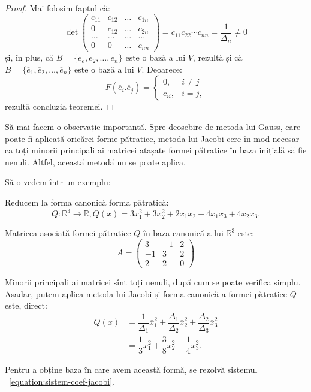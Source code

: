 \begin{proof}
Mai folosim faptul că: 
 \[
	\det \begin{pmatrix}
	          c_{11} & c_{12} & \dots & c_{1n} \\
	          0 & c_{12} & \dots & c_{2n} \\
	          \dots & \dots & \dots & \dots \\
	          0 & 0 & \dots & c_{nn}
         \end{pmatrix} = c_{11} c_{22} \cdots c_{nn} = \dfrac{1}{\Delta_n} 
    \neq 0
\]
și, în plus, că $B = \{e_e, e_2, \dots, e_n\}$ este o bază a lui $V$, rezultă și
că $\overline{B} = \{\overline{e}_1, \overline{e}_2, \dots, \overline{e}_n \}$
este o bază a lui $V$. Deoarece: 
 \[
	F(\overline{e}_i. \overline{e}_j) = \begin{cases}	
	                                        0, & i \neq j \\
	                                        c_{ii}, & i = j,
                                         \end{cases}
\]
rezultă concluzia teoremei.
\end{proof}

Să mai facem o observație importantă. Spre deosebire de metoda lui Gauss, care
poate fi aplicată oricărei forme pătratice, metoda lui Jacobi cere în mod 
necesar ca toți minorii principali ai matricei atașate formei pătratice în baza
inițială să fie nenuli. Altfel, această metodă nu se poate aplica.

Să o vedem într-un exemplu:
\begin{example}
	Reducem la forma canonică forma pătratică: 
 \[
	Q : \mathbb{R}^3 \to \mathbb{R}, 
	Q(x) = 3x_1^2 + 3x_2^2 + 2x_1 x_2 + 4x_1x_3 + 4x_2x_3.
\]

Matricea asociată formei pătratice $Q$ în baza canonică a lui $\mathbb{R}^3$
este: 
 \[
	A = \begin{pmatrix}
	        3 & -1 & 2 \\
	        -1 & 3 & 2 \\
	        2 & 2 & 0
        \end{pmatrix}
\]

Minorii principali ai matricei sînt toți nenuli, după cum se poate verifica
simplu. Așadar, putem aplica metoda lui Jacobi și forma canonică a formei 
pătratice $Q$ este, direct:
\begin{align*}
	Q(x) &= \dfrac{1}{\Delta_1} \overline{x}_1^2 + \dfrac{\Delta_1}{\Delta_2}
	        \overline{x}_2^2 + \dfrac{\Delta_2}{\Delta_3} \overline{x}_3^2 \\
	     &= \dfrac{1}{3} \overline{x}_1^2 + \dfrac{3}{8} \overline{x}_2^2 -
	        \dfrac{1}{4} \overline{x}_3^2.
\end{align*}

Pentru a obține baza în care avem această formă, se rezolvă sistemul
~\eqref{equation:sistem-coef-jacobi}.
\end{example}

